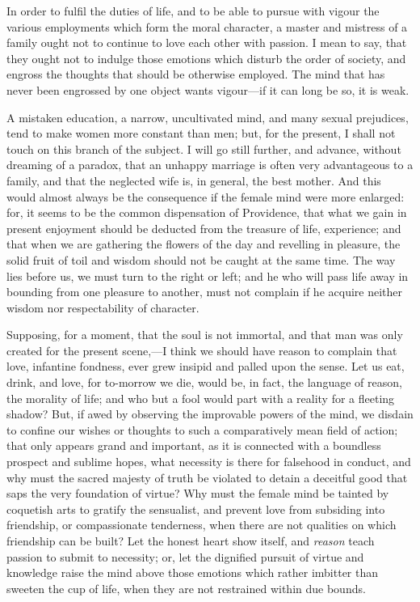In order to fulfil the duties of life, and to be able to pursue with
vigour the various employments which form the moral character, a
master and mistress of a family ought not to continue to love each
other with passion. I mean to say, that they ought not to indulge
those emotions which disturb the order of society, and engross the
thoughts that should  be otherwise employed. The mind that
has never been engrossed by one object wants vigour---if it can long
be so, it is weak.

A mistaken education, a narrow, uncultivated mind, and many sexual
prejudices, tend to make women more constant than men; but, for the
present, I shall not touch on this branch of the subject. I will go
still further, and advance, without dreaming of a paradox, that an
unhappy marriage is often very advantageous to a family, and that the
neglected wife is, in general, the best mother. And this would almost
always be the consequence if the female mind were more enlarged: for,
it seems to be the common dispensation of Providence, that what we
gain in present enjoyment should be deducted from the treasure of
life, experience; and that when we are gathering the flowers of the
day and revelling in pleasure, the solid fruit of toil and wisdom
should not be caught at the same time. The way lies before us, we must
turn to the right or left; and he who will pass life away in
bounding from one pleasure to another, must not complain if he acquire
neither wisdom nor respectability of character.

Supposing, for a moment, that the soul is not immortal, and
that man was only created for the present scene,---I think we should
have reason to complain that love, infantine fondness, ever grew
insipid and palled upon the sense. Let us eat, drink, and love, for
to-morrow we die, would be, in fact, the language of reason, the
morality of life; and who but a fool would part with a reality for a
fleeting shadow? But, if awed by observing the improvable powers of
the mind, we disdain to confine our wishes or thoughts to such a
comparatively mean field of action; that only appears grand and
important, as it is connected with a boundless prospect and sublime
hopes, what necessity is there for falsehood in conduct, and why must
the sacred majesty of truth be violated to detain a deceitful good
that saps the very foundation of virtue? Why must the female mind be
tainted by coquetish arts to gratify the sensualist, and prevent love
from subsiding into friendship, or compassionate tenderness, when
there are not qualities on which friendship can be built? Let the
honest heart show itself, and \textit{reason} teach passion to submit
to necessity; or, let  the dignified pursuit of virtue and
knowledge raise the mind above those emotions which rather imbitter
than sweeten the cup of life, when they are not restrained within due
bounds.

